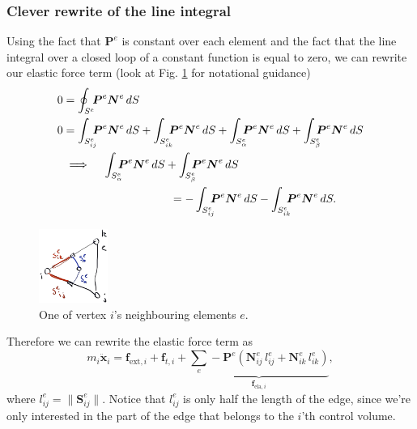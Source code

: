 \documentclass[acmtog]{acmart}
\begin{document}
\subsubsection*{Clever rewrite of the line integral}
Using the fact that $\boldsymbol P^e$ is constant over each element and the fact that the line integral over a closed loop of a constant function is equal to zero, we can rewrite our elastic force term (look at Fig. \ref{fig:elem1} for notational guidance)
%
\begin{align}
  0 & = \oint_{S^e} \hspace{-4pt} \boldsymbol P^e \boldsymbol N^e \, dS                                                                                                                                                                                                                              \\
  0 & = \int_{S_{ij}^e} \hspace{-6pt} \boldsymbol P^e \boldsymbol N^e \, dS + \int_{S_{ik}^e} \hspace{-6pt} \boldsymbol P^e \boldsymbol N^e \, dS + \int_{S_{\alpha}^e} \hspace{-6pt} \boldsymbol P^e \boldsymbol N^e \, dS + \int_{S_{\beta}^e} \hspace{-6pt} \boldsymbol P^e \boldsymbol N^e \, dS \\
    & \implies \quad \int_{S_{\alpha}^e} \hspace{-6pt} \boldsymbol P^e \boldsymbol N^e \, dS + \int_{S_{\beta}^e} \hspace{-6pt} \boldsymbol P^e \boldsymbol N^e \, dS \notag                                                                                                                         \\
    & \hspace{95pt} =  -\int_{S_{ij}^e} \hspace{-6pt} \boldsymbol P^e \boldsymbol N^e \, dS - \int_{S_{ik}^e} \hspace{-6pt} \boldsymbol P^e \boldsymbol N^e \, dS.
\end{align}
%
\begin{figure}
  \centering
  \includegraphics[width=0.2\textwidth]{Images/elem1.png}
  \caption{One of vertex $i$'s neighbouring elements $e$.\label{fig:elem1}}
\end{figure}
%
Therefore we can rewrite the elastic force term as
%
\begin{equation}
  m_i \ddot{\boldsymbol x}_i = \boldsymbol f_{\mathrm{ext},i} + \boldsymbol f_{t, i} + \underbrace{ \sum_e - \boldsymbol P^e \left( \boldsymbol N_{ij}^e \,l_{ij}^e + \boldsymbol N_{ik}^e \,l_{ik}^e \right)  }_{ \boldsymbol f_{\mathrm{ela}, i} },
\end{equation}
%
where $l_{ij}^e = \lVert \boldsymbol S_{ij}^e \rVert$. Notice that $l_{ij}^e$ is only half the length of the edge, since we're only interested in the part of the edge that belongs to the $i$'th control volume.
\end{document}
